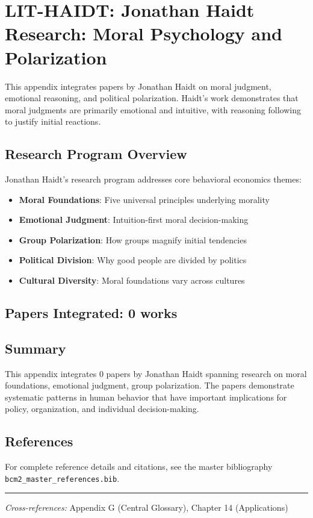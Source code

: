 \section{LIT-HAIDT: Jonathan Haidt Research: Moral Psychology and Polarization}
\label{app:litz}

This appendix integrates papers by Jonathan Haidt on moral judgment,
emotional reasoning, and political polarization. Haidt's work demonstrates that moral
judgments are primarily emotional and intuitive, with reasoning following to justify
initial reactions.

\subsection{Research Program Overview}

Jonathan Haidt's research program addresses core behavioral economics themes:

\begin{itemize}
  \item \textbf{Moral Foundations}: Five universal principles underlying morality
  \item \textbf{Emotional Judgment}: Intuition-first moral decision-making
  \item \textbf{Group Polarization}: How groups magnify initial tendencies
  \item \textbf{Political Division}: Why good people are divided by politics
  \item \textbf{Cultural Diversity}: Moral foundations vary across cultures
\end{itemize}

\subsection{Papers Integrated: 0 works}

\subsection{Summary}

This appendix integrates 0 papers by Jonathan Haidt
spanning research on moral foundations, emotional judgment, group polarization.
The papers demonstrate systematic patterns in human behavior that have important
implications for policy, organization, and individual decision-making.

\subsection{References}

For complete reference details and citations, see the master bibliography
\texttt{bcm2\_master\_references.bib}.

\vspace{1em}
\hrule
\vspace{0.5em}

\noindent\textit{Cross-references:}
Appendix G (Central Glossary), Chapter 14 (Applications)

